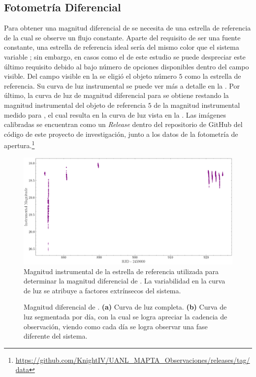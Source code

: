 \subsection{Fotometría Diferencial}
Para obtener una magnitud diferencial de \atoObjId se necesita de una estrella
de referencia de la cual se observe un flujo constante. Aparte del requisito de
ser una fuente constante, una estrella de referencia ideal sería del mismo color
que el sistema variable \atoObjIdNoSpace; sin embargo, en casos como el de este
estudio se puede despreciar este último requisito debido al bajo número de
opciones disponibles dentro del campo visible. Del campo visible en la
 se eligió el objeto número $5$ como la estrella de
referencia. Su curva de luz instrumental se puede ver más a detalle en la
. Por último, la curva de luz de
magnitud diferencial para \atoObjId se obtiene restando la magnitud instrumental
del objeto de referencia $5$ de la magnitud instrumental medido para
\atoObjIdNoSpace, el cual resulta en la curva de luz vista en la
. Las imágenes calibradas se encuentran
como un \textit{Release} dentro del repositorio de GitHub del código de este
proyecto de investigación, junto a los datos de la fotometría de
apertura.\footnote{\url{https://github.com/KnightIV/UANL_MAPTA_Observaciones/releases/tag/data}}

\begin{figure}[!ht]
	\centering
	\includegraphics[scale=0.39]{Observaciones/Secciones/Figures/Figura Magnitud Instrumental Estrella Referencia.png}
	\caption{Magnitud instrumental de la estrella de referencia utilizada para
	determinar la magnitud diferencial de \atoObjIdNoSpace. La variabilidad en
	la curva de luz se atribuye a factores extrínsecos del sistema.}
	\label{figuraCurvaLuzInstrumentalReferencia}
\end{figure}

\begin{figure}[!ht]
	\centering
	\caption{Magnitud diferencial de \atoObjIdNoSpace. \textbf{(a)} Curva de luz
	completa. \textbf{(b)} Curva de luz segmentada por día, con la cual se logra
	apreciar la cadencia de observación, viendo como cada día se logra observar
	una fase diferente del sistema.}
	\label{figuraIturbideAtoLightCurve}
\end{figure}